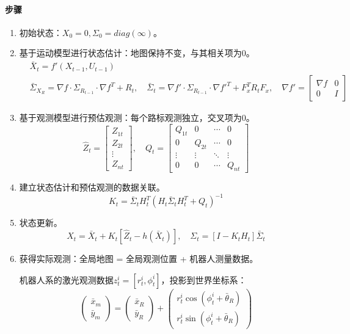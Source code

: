 \documentclass[
12pt, %
a4paper, 
oneside, %
headinclude,footinclude, %
]{scrartcl}
\begin{document}
\paragraph{步骤}
\begin{enumerate}
\item 初始状态：$ X_0 = 0, \Sigma_0 = diag(\infty) $。
\item 基于运动模型进行状态估计：地图保持不变，与其相关项为$ 0 $。
\begin{align*}
&\bar{X}_t = f'(X_{t - 1}, U_{t - 1}) \\
&\bar{\Sigma}_{X_R} = \nabla f \cdot \Sigma_{R_{t - 1}} \cdot \nabla f^T + R_t, \quad
\bar{\Sigma}_t = \nabla f' \cdot \Sigma_{R_{t - 1}} \cdot \nabla f'^T + F_x^T R_t F_x, \quad
\nabla f' = \begin{bmatrix} \nabla f & 0 \\ 0 & I \end{bmatrix}
\end{align*}
\item 基于观测模型进行预估观测：每个路标观测独立，交叉项为$ 0 $。
$$ \hat{Z}_t = \begin{bmatrix} Z_{1t} \\ Z_{2t} \\ \vdots \\ Z_{nt} \end{bmatrix}, \quad Q_t = \begin{bmatrix} Q_{1t} & 0 & \cdots & 0 \\ 0 & Q_{2t} & \cdots & 0 \\ \vdots & \vdots & \ddots & \vdots \\ 0 & 0 & \cdots & Q_{nt} \end{bmatrix} $$
\item 建立状态估计和预估观测的数据关联。
$$ K_t = \bar{\Sigma}_t H_t^T (H_t \bar{\Sigma}_t H_t^T + Q_t)^{-1} $$
\item 状态更新。
$$ X_t = \bar{X}_t + K_t[\hat{Z}_t - h(\bar{X}_t)], \quad \Sigma_t = [I - K_t H_t]\bar{\Sigma}_t $$
\item 获得实际观测：全局地图 = 全局观测位置 + 机器人测量数据。

机器人系的激光观测数据$ z^i_t = [r_t^i, \phi_t^i] $，投影到世界坐标系：
$$ \begin{pmatrix} \bar{x}_m \\ \bar{y}_m \end{pmatrix} = \begin{pmatrix} \bar{x}_R \\ \bar{y}_R \end{pmatrix} + \begin{pmatrix} r_t^i \cos(\phi_t^i + \bar{\theta}_R) \\ r_t^i \sin(\phi_t^i + \bar{\theta}_R) \end{pmatrix} $$


\end{enumerate}
\end{document}
